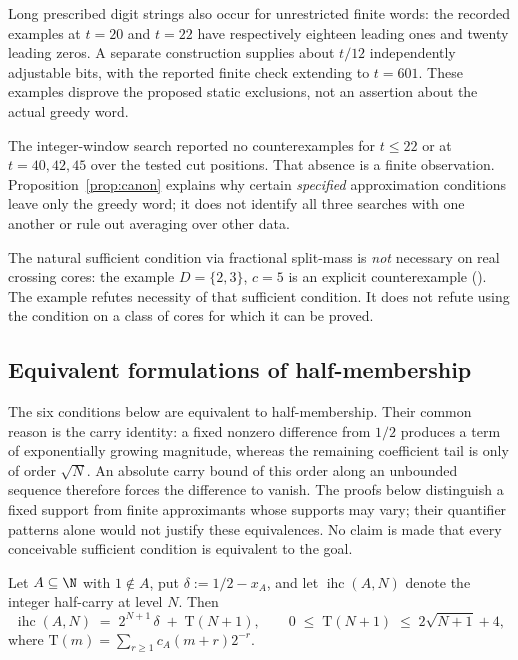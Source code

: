 Long prescribed digit strings also occur for unrestricted finite words:
the recorded examples at $t=20$ and $t=22$ have respectively eighteen
leading ones and twenty leading zeros.  A separate construction supplies
about $t/12$ independently adjustable bits, with the reported finite check
extending to $t=601$.  These examples disprove the proposed static
exclusions, not an assertion about the actual greedy word.

The integer-window search reported no counterexamples for $t\le22$ or at
$t=40,42,45$ over the tested cut positions.  That absence is a finite
observation.  Proposition~\ref{prop:canon} explains why certain
\emph{specified} approximation conditions leave only the greedy word; it
does not identify all three searches with one another or rule out averaging
over other data.

\begin{rem}
The natural sufficient condition via fractional split-mass is \emph{not} necessary on real crossing
cores: the example $D = \{2,3\}$, $c = 5$ is an explicit counterexample
().
The example refutes necessity of that sufficient condition.  It does not
refute using the condition on a class of cores for which it can be proved.
\end{rem}

\subsection{Equivalent formulations of half-membership}
\label{bar:collapse}

The six conditions below are equivalent to half-membership. Their common
reason is the carry identity: a fixed nonzero difference from $1/2$
produces a term of exponentially growing magnitude, whereas the remaining
coefficient tail is only of order $\sqrt N$. An absolute carry bound of
this order along an unbounded sequence therefore forces the difference to
vanish. The proofs below distinguish a fixed support from finite approximants
whose supports may vary; their quantifier patterns alone would not justify
these equivalences. No claim is made that every conceivable sufficient
condition is equivalent to the goal.

\begin{lem}
\label{lem:collapse-mech}
Let $A \subseteq \N$ with $1 \notin A$, put $\delta := 1/2 - x_A$, and let
$\operatorname{ihc}(A,N)$ denote the integer half-carry at level $N$. Then
\[
  \operatorname{ihc}(A,N) \;=\; 2^{N+1}\,\delta \;+\; \mathrm{T}(N+1),
  \qquad 0 \;\le\; \mathrm{T}(N+1) \;\le\; 2\sqrt{N+1} + 4 ,
\]
where $\mathrm T(m)=\sum_{r\ge1}c_A(m+r)2^{-r}$.
\end{lem}

